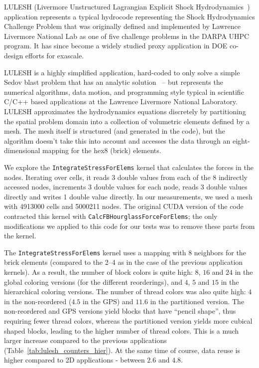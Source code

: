 
\noindent LULESH (Livermore Unstructured Lagrangian Explicit Shock 
Hydrodynamics~\cite{LULESH2:changes}) application represents a typical 
hydrocode representing the Shock Hydrodynamics Challenge Problem that was 
originally defined and implemented by Lawrence Livermore National Lab as one of 
five challenge problems in the DARPA UHPC program. It  has since become a widely 
studied proxy application in DOE co-design efforts for exascale. 

LULESH is a highly simplified application, hard-coded to only solve a simple
Sedov blast problem that has an analytic solution~\cite{LULESH:spec} – but
represents the numerical algorithms, data motion, and programming style typical
in scientific C/C++ based applications at the Lawrence Livermore National
Laboratory. LULESH approximates the hydrodynamics equations discretely by
partitioning the spatial problem domain into a collection of volumetric elements
defined by a mesh. The mesh itself is structured (and generated in the code), 
but the algorithm doesn't take this into account and accesses the data through 
an eight-dimensional mapping for the hex8 (brick) elements.

We explore the \texttt{IntegrateStressForElems} kernel that calculates the
forces in the nodes. Iterating over cells, it reads 3 double values from each 
of the 8 indirectly accessed nodes, increments 3 double values for each node, 
reads 3 double values directly and writes 1 double value directly. In our 
measurements, we used a mesh with \num{4913000} cells and \num{5000211}
nodes. The original CUDA version of the code contracted this kernel with
\texttt{CalcFBHourglassForceForElems}; the only modifications we applied to 
this code for our tests was to remove these parts from the kernel.

The \texttt{IntegrateStressForElems} kernel uses a mapping with 8 neighbors for 
the brick elements (compared to the 2--4 as in the case of the previous 
application kernels). As a result, the number of block colors is quite high: $8$, $16$ 
and $24$ in the global coloring versions (for the different reorderings), and 
$4$, $5$ and $15$ in the hierarchical coloring versions. The number of thread 
colors was also quite high: $4$ in the non-reordered ($4.5$ in the GPS) and 
$11.6$ in the partitioned version. The non-reordered and GPS versions yield 
blocks that have ``pencil shape'', thus requiring fewer thread colors, whereas 
the partitioned version yields more cubical shaped blocks, leading to the higher 
number of thread colors. This is a much larger increase compared to the previous 
applications (Table~\ref{tab:lulesh_counters_hier}). At the same time of course, 
data reuse is higher compared to 2D applications - between $2.6$ and $4.8$.

